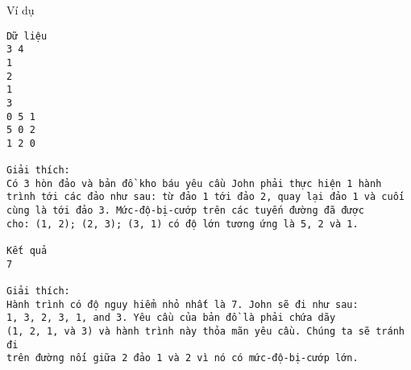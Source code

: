 Ví dụ
\begin{verbatim}
Dữ liệu
3 4
1
2
1
3
0 5 1
5 0 2
1 2 0

Giải thích:
Có 3 hòn đảo và bản đồ kho báu yêu cầu John phải thực hiện 1 hành 
trình tới các đảo như sau: từ đảo 1 tới đảo 2, quay lại đảo 1 và cuối 
cùng là tới đảo 3. Mức-độ-bị-cướp trên các tuyến đường đã được 
cho: (1, 2); (2, 3); (3, 1) có độ lớn tương ứng là 5, 2 và 1.

Kết quả
7

Giải thích:
Hành trình có độ nguy hiểm nhỏ nhất là 7. John sẽ đi như sau: 
1, 3, 2, 3, 1, and 3. Yêu cầu của bản đồ là phải chứa dãy
(1, 2, 1, và 3) và hành trình này thỏa mãn yêu cầu. Chúng ta sẽ tránh đi 
trên đường nối giữa 2 đảo 1 và 2 vì nó có mức-độ-bị-cướp lớn.
\end{verbatim}